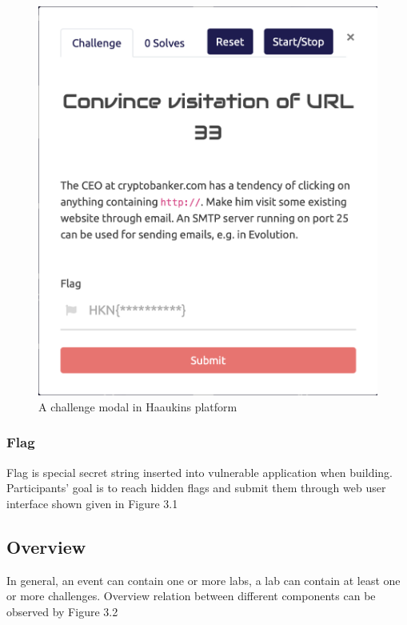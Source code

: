  
 \begin{figure}[htbp]
\centerline{\includegraphics[scale=.4]{figures/flag-submission-modal.png}}
\caption{A challenge modal in Haaukins platform}
\label{fig}
\end{figure}
\newpage


\subsubsection{Flag}
 Flag is special secret string inserted into vulnerable application when building. Participants' goal is to reach hidden flags and submit them through web user interface shown given in Figure 3.1


\subsection{Overview}
 In general, an event can contain one or more labs, a lab can contain at least one or more challenges. Overview relation between different components can be observed by Figure 3.2
 
